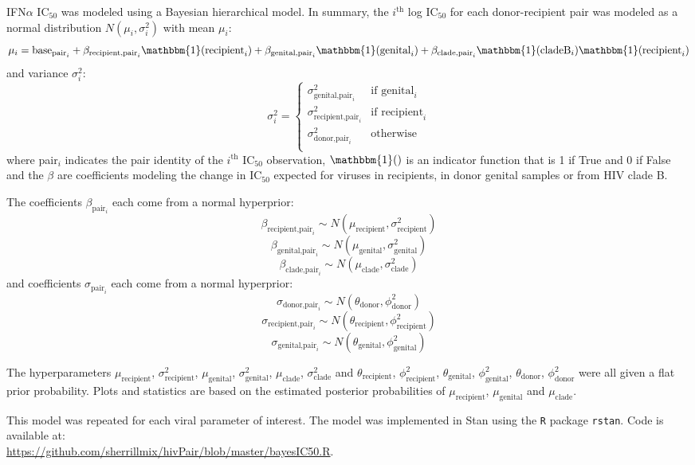 \documentclass[12pt]{article}
\begin{document}
IFN$\alpha$ IC$_{50}$ was modeled using a Bayesian hierarchical model. In summary, the $i^\text{th}$ log IC$_{50}$ for each donor-recipient pair was modeled as a normal distribution $N(\mu_i,\sigma^2_i)$ with mean $\mu_i$:
\[
  \mu_i=\text{base}_{\text{pair}_i} + \beta_{\text{recipient,pair}_i} \mathbbm{1}(\text{recipient}_i) + \beta_{\text{genital,pair}_i} \mathbbm{1}(\text{genital}_i) + \beta_{\text{clade,pair}_i} \mathbbm{1}(\text{cladeB}_i)\mathbbm{1}(\text{recipient}_i)
\]
and variance $\sigma^2_i$:
\[
  \sigma^2_i = \begin{cases}
    \sigma^2_{\text{genital,pair}_i} & \text{if } \text{genital}_i\\
    \sigma^2_{\text{recipient,pair}_i} & \text{if } \text{recipient}_i\\
    \sigma^2_{\text{donor,pair}_i} & \text{otherwise}\\
  \end{cases}
\]
where pair$_i$ indicates the pair identity of the $i^\text{th}$ IC$_{50}$ observation, $\mathbbm{1}()$ is an indicator function that is 1 if True and 0 if False and the $\beta$ are coefficients modeling the change in IC$_{50}$ expected for viruses in recipients, in donor genital samples or from HIV clade B.

The coefficients $\beta_{\text{pair}_i}$ each come from a normal hyperprior:
\[\beta_{\text{recipient,pair}_i} \sim N(\mu_{\text{recipient}},\sigma^2_{\text{recipient}})\]
\[ \beta_{\text{genital,pair}_i} \sim N(\mu_{\text{genital}},\sigma^2_{\text{genital}})\]
\[\beta_{\text{clade,pair}_i} \sim N(\mu_{\text{clade}},\sigma^2_{\text{clade}}) \]
and coefficients $\sigma_{\text{pair}_i}$ each come from a normal hyperprior:
\[\sigma_{\text{donor,pair}_i} \sim N(\theta_\text{donor},\phi^2_\text{donor})\]
\[\sigma_{\text{recipient,pair}_i} \sim N(\theta_\text{recipient},\phi^2_\text{recipient})\]
\[\sigma_{\text{genital,pair}_i} \sim N(\theta_\text{genital},\phi^2_\text{genital})\]

The hyperparameters $\mu_{\text{recipient}}$, $\sigma^2_{\text{recipient}}$, $\mu_{\text{genital}}$, $\sigma^2_{\text{genital}}$, $\mu_{\text{clade}}$, $\sigma^2_{\text{clade}}$ and 
$\theta_{\text{recipient}}$, $\phi^2_{\text{recipient}}$, $\theta_{\text{genital}}$, $\phi^2_{\text{genital}}$, $\theta_{\text{donor}}$, $\phi^2_{\text{donor}}$ were all given a flat prior probability.  Plots and statistics are based on the estimated posterior probabilities of $\mu_{\text{recipient}}$, $\mu_{\text{genital}}$ and $\mu_{\text{clade}}$.


This model was repeated for each viral parameter of interest. The model was implemented in Stan using the \texttt{R} package \texttt{rstan}. Code is available at:\\
\url{https://github.com/sherrillmix/hivPair/blob/master/bayesIC50.R}.
\end{document}
